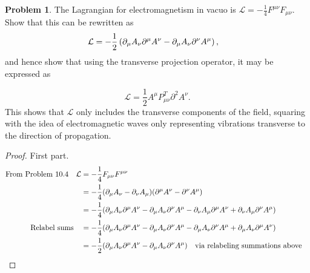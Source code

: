 \documentclass[letterpaper]{article}
\theoremstyle{definition}
\newtheorem{prob}{Problem}[section]
\begin{document}
\begin{prob}
  The Lagrangian for electromagnetism in vacuo is $\mathcal{L}=-\frac{1}{4}F^{\mu\nu}F_{\mu\nu}$. Show that this can be rewritten as
  \[\mathcal{L}=-\frac{1}{2}\left(\partial_\mu A_\nu\partial^\mu A^\nu-\partial_\mu A_\nu\partial^\nu A^\mu\right)\qcomma\]
  and hence show that using the transverse projection operator, it may be expressed as

  \[\mathcal{L}=\frac{1}{2}A^\mu P^T_{\mu\nu}\partial^2A^\nu.\]
  This shows that $\mathcal{L}$ only includes the transverse components of the field, squaring with the idea of electromagnetic waves only representing vibrations transverse to the direction of propagation.
\end{prob}

\begin{proof}First part.
  \begin{align*}
    \qq*{From Problem 10.4}\mathcal{L} & =-\frac{1}{4}F_{\mu\nu}F^{\mu\nu}                                                                                                                                              \\
                                       & =-\frac{1}{4}\pqty{\partial_\mu A_\nu - \partial_\nu A_\mu}\pqty{\partial^\mu A^\nu-\partial^\nu A^\mu}                                                                        \\
                                       & =-\frac{1}{4}\pqty{\partial_\mu A_\nu \partial^\mu A^\nu -\partial_\mu A_\nu \partial^\nu A^\mu - \partial_\nu A_\mu \partial^\mu A^\nu+\partial_\nu A_\mu \partial^\nu A^\mu} \\
    \qq*{Relabel sums}                 & =-\frac{1}{4}\pqty{\partial_\mu A_\nu \partial^\mu A^\nu -\partial_\mu A_\nu \partial^\nu A^\mu - \partial_\mu A_\nu \partial^\nu A^\mu+\partial_\mu A_\nu \partial^\mu A^\nu} \\
                                       & =-\frac{1}{2}\pqty{\partial_\mu A_\nu \partial^\mu A^\nu -\partial_\mu A_\nu \partial^\nu A^\mu} \qq{via relabeling summations above}                                          \\
  \end{align*}
\end{proof}
\end{document}
